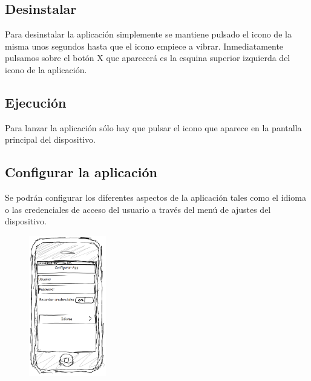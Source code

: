 \subsection{Desinstalar}
Para desinstalar la aplicación simplemente se mantiene pulsado el icono de la misma unos segundos hasta que el icono empiece a vibrar. Inmediatamente pulsamos sobre el botón \textsf{X} que aparecerá es la esquina superior izquierda del icono de la aplicación. 
\subsection{Ejecución}
Para lanzar la aplicación sólo hay que pulsar el icono que aparece en la pantalla principal del dispositivo.
\subsection{Configurar la aplicación}
Se podrán configurar los diferentes aspectos de la aplicación tales como el idioma o las credenciales de acceso del  usuario a través del menú de ajustes del dispositivo. 
\begin{figure}[H]
    \centering
       \includegraphics[width=0.3\textwidth]{./images/req_conf_app.png}
   \label{fig:Requisito configurar la aplicación}
\end{figure}
